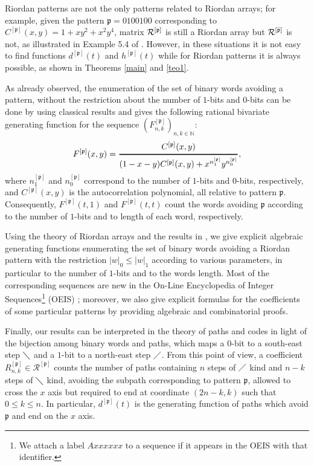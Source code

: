 \begin{remark}
 Riordan patterns are not the only patterns related to Riordan arrays; for
 example, given the pattern $\mathfrak{p}=0100100$ corresponding to
 $C^{[\mathfrak{p}]}(x,y)=1+xy^2+x^2y^4$, matrix ${\cal{R}^{[\mathfrak{p}]}}$
 is still a Riordan array but ${\cal{R}^{[\bar{\mathfrak{p}}]}}$
is not, as illustrated in Example 5.4 of \citep{Baccherini2007BinaryWE}. However, in these
situations it is not easy to find functions $d^{[\mathfrak{p}]}(t)$ and
$h^{[\mathfrak{p}]}(t)$ while for Riordan patterns it is always possible, as
shown in Theorems \ref{main} and \ref{teo1}.
\end{remark}


As already observed, the enumeration of the set of binary words avoiding a
pattern, without the restriction about the number of $1$-bits  and $0$-bits can be
done by using classical results and gives
the following rational bivariate generating function for the sequence
$(F_{n,k}^{[\mathfrak{p}]})_{n,k \in \mathbb{N}}:$ $$F^{[\mathfrak{p}]}(x,y)
=\genfrac{}{}{1pt}{0}{C^{[\mathfrak{p}]}(x,y)}{(1-x-y)C^{[\mathfrak{p}]}(x,y)
+x^{n_1^{[\mathfrak{p}]}}y^{n_0^{[\mathfrak{p}]}}},$$ where
$n_1^{[\mathfrak{p}]}$ and  $n_0^{[\mathfrak{p}]}$ correspond to the number of
$1$-bits  and $0$-bits, respectively, and $C^{[\mathfrak{p}]}(x,y)$ is the
autocorrelation polynomial, all relative to pattern $\mathfrak{p}$.
Consequently, $F^{[\mathfrak{p}]}(t,1)$ and $F^{[\mathfrak{p}]}(t,t)$ count the
words avoiding $\mathfrak{p}$ according to the number of $1$-bits  and to length
of each word, respectively.

Using the theory of Riordan arrays and the results in \citep{MERLINI20112988}, we give
explicit algebraic generating functions enumerating the set of binary words
avoiding a Riordan pattern with the restriction $|w|_0\leq |w|_1$ according to
various parameters, in particular to the number of $1$-bits  and to the words length.
Most of the corresponding sequences are new in the On-Line Encyclopedia of
Integer Sequences\footnote{We attach a label $Axxxxxx$ to a
sequence if it appears in the OEIS with that identifier.} (OEIS) \citep{OEIS};
moreover, we also give explicit formulas for the coefficients of some
particular patterns by providing algebraic and combinatorial proofs.

Finally, our results can be interpreted in the theory of paths and codes in
light of the bijection among binary words and paths, which maps a $0$-bit to a
south-east step $\diagdown$ and a $1$-bit  to a north-east step $\diagup$. From
this point of view, a coefficient $R_{n,k}^{[\mathfrak{p}]} \in
\mathcal{R}^{[\mathfrak{p}]}$ counts the number of paths containing $n$ steps
of $\diagup$ kind and $n-k$ steps of $\diagdown$ kind, avoiding the subpath
corresponding to pattern $\mathfrak{p}$, allowed to cross the $x$ axis but
required to end at coordinate $(2n-k, k)$ such that $0 \leq k \leq n$.
In particular, $d^{[\mathfrak{p}]}(t)$ is the generating function of paths which avoid
 $\mathfrak{p}$ and end on the $x$ axis.


